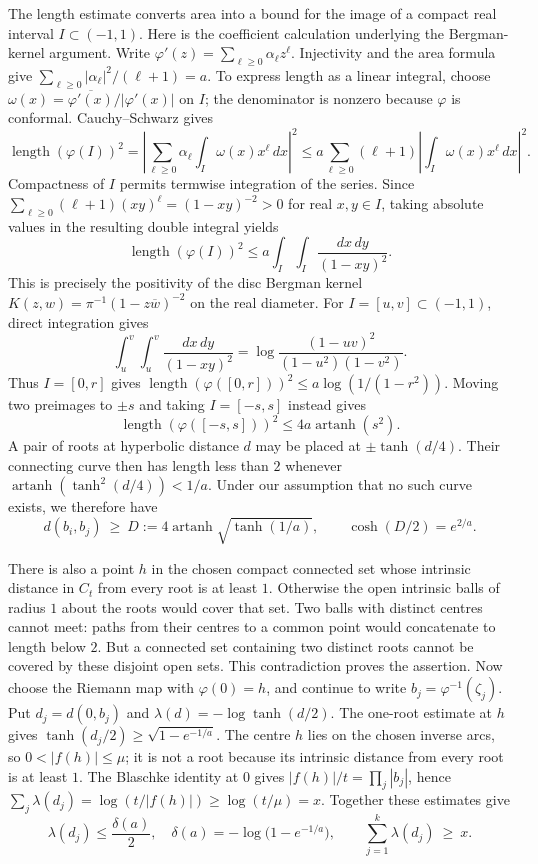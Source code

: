 The length estimate converts area into a bound for the image of a compact real
interval $I\subset(-1,1)$. Here is the coefficient calculation underlying
the Bergman-kernel argument. Write
$\varphi'(z)=\sum_{\ell\ge0}\alpha_\ell z^\ell$. Injectivity and the
area formula give
$\sum_{\ell\ge0}|\alpha_\ell|^2/(\ell+1)=a$.
To express length as a linear integral, choose
$\omega(x)=\overline{\varphi'(x)}/|\varphi'(x)|$ on $I$; the denominator
is nonzero because $\varphi$ is conformal. Cauchy--Schwarz gives
\[
 \operatorname{length}(\varphi(I))^2
 =\left|\sum_{\ell\ge0}\alpha_\ell\int_I\omega(x)x^\ell\,dx\right|^2
 \le a\sum_{\ell\ge0}(\ell+1)
       \left|\int_I\omega(x)x^\ell\,dx\right|^2.
\]
Compactness of $I$ permits termwise integration of the series.
Since $\sum_{\ell\ge0}(\ell+1)(xy)^\ell=(1-xy)^{-2}>0$ for real
$x,y\in I$, taking absolute values in the resulting double integral yields
\[
 \operatorname{length}(\varphi(I))^2
 \le a\int_I\!\int_I\frac{dx\,dy}{(1-xy)^2}.
\]
This is precisely the positivity of the disc Bergman kernel
$K(z,w)=\pi^{-1}(1-z\overline w)^{-2}$ on the real diameter.
For $I=[u,v]\subset(-1,1)$, direct integration gives
\[
 \int_u^v\!\int_u^v\frac{dx\,dy}{(1-xy)^2}
 =\log\frac{(1-uv)^2}{(1-u^2)(1-v^2)}.
\]
Thus $I=[0,r]$ gives
$\operatorname{length}(\varphi([0,r]))^2\le a\log(1/(1-r^2))$.
Moving two preimages to $\pm s$ and taking $I=[-s,s]$ instead gives
\[
 \operatorname{length}(\varphi([-s,s]))^2\le4a\operatorname{artanh}(s^2).
\]
A pair of roots at hyperbolic distance $d$ may be placed at $\pm\tanh(d/4)$.
Their connecting curve then has length less than $2$ whenever
$\operatorname{artanh}(\tanh^2(d/4))<1/a$. Under our assumption that no
such curve exists, we therefore have
\begin{equation}\label{eq:lc-separation}
 d(b_i,b_j)\ \ge\ D:=4\operatorname{artanh}\sqrt{\tanh(1/a)},
 \qquad \cosh(D/2)=e^{2/a}.
\end{equation}

There is also a point $h$ in the chosen compact connected set whose
intrinsic distance in $C_t$ from every root is at least $1$.
Otherwise the open intrinsic balls of radius $1$ about the roots would
cover that set. Two balls with distinct centres cannot meet: paths from
their centres to a common point would concatenate to length below $2$.
But a connected set containing two distinct roots cannot be covered by
these disjoint open sets. This contradiction proves the assertion.
Now choose the Riemann map with $\varphi(0)=h$, and continue to write
$b_j=\varphi^{-1}(\zeta_j)$. Put $d_j=d(0,b_j)$ and
$\lambda(d)=-\log\tanh(d/2)$.  The one-root estimate at $h$
gives $\tanh(d_j/2)\ge\sqrt{1-e^{-1/a}}$. The centre $h$ lies on the
chosen inverse arcs, so $0<|f(h)|\le\mu$; it is not a root because its
intrinsic distance from every root is at least $1$. The Blaschke identity
at $0$ gives $|f(h)|/t=\prod_j|b_j|$, hence
$\sum_j\lambda(d_j)=\log(t/|f(h)|)\ge\log(t/\mu)=x$.
Together these estimates give
\begin{equation}\label{eq:lc-radius-and-budget}
 \lambda(d_j)\le\frac{\delta(a)}2,\quad
 \delta(a)=-\log\bigl(1-e^{-1/a}\bigr),
 \qquad
 \sum_{j=1}^{k}\lambda(d_j)\ \ge\ x .
\end{equation}

